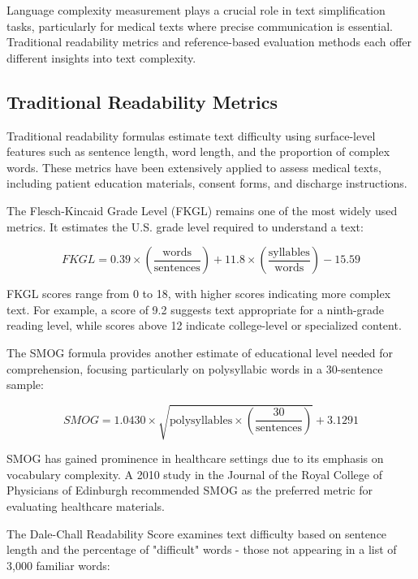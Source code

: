 Language complexity measurement plays a crucial role in text simplification tasks, particularly for medical texts where precise communication is essential. Traditional readability metrics and reference-based evaluation methods each offer different insights into text complexity.

\subsection{Traditional Readability Metrics}

Traditional readability formulas estimate text difficulty using surface-level features such as sentence length, word length, and the proportion of complex words. These metrics have been extensively applied to assess medical texts, including patient education materials, consent forms, and discharge instructions.

The Flesch-Kincaid Grade Level (FKGL) remains one of the most widely used metrics. It estimates the U.S. grade level required to understand a text:

\begin{equation}
    FKGL = 0.39 \times \left(\frac{\text{words}}{\text{sentences}}\right) + 11.8 \times \left(\frac{\text{syllables}}{\text{words}}\right) - 15.59
\end{equation}

FKGL scores range from 0 to 18, with higher scores indicating more complex text. For example, a score of 9.2 suggests text appropriate for a ninth-grade reading level, while scores above 12 indicate college-level or specialized content.

The SMOG formula provides another estimate of educational level needed for comprehension, focusing particularly on polysyllabic words in a 30-sentence sample:

\begin{equation}
    SMOG = 1.0430 \times \sqrt{\text{polysyllables} \times \left(\frac{30}{\text{sentences}}\right)} + 3.1291
\end{equation}

SMOG has gained prominence in healthcare settings due to its emphasis on vocabulary complexity. A 2010 study in the Journal of the Royal College of Physicians of Edinburgh recommended SMOG as the preferred metric for evaluating healthcare materials.

The Dale-Chall Readability Score examines text difficulty based on sentence length and the percentage of "difficult" words - those not appearing in a list of 3,000 familiar words:

